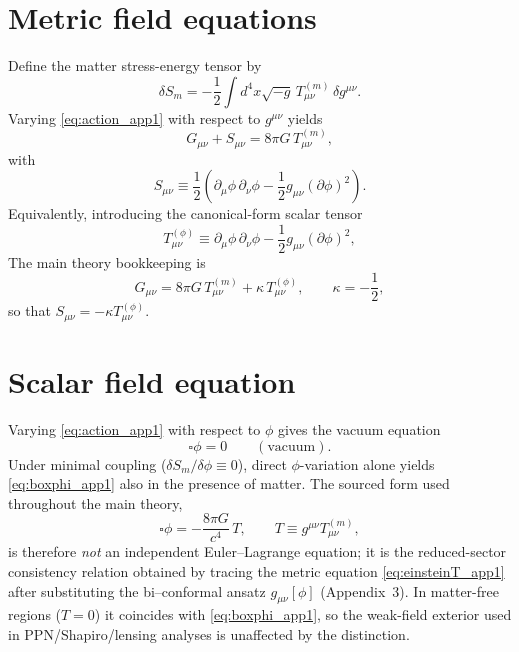 \documentclass[11pt]{article}
\begin{document}
\section{Metric field equations}\label{sec:metric_app1}
Define the matter stress-energy tensor by
\begin{equation}
\delta S_m=-\frac12\int d^4x\sqrt{-g}\,T^{(m)}_{\mu\nu}\,\delta g^{\mu\nu}.
\label{eq:Tmdef_app1}
\end{equation}
Varying \eqref{eq:action_app1} with respect to $g^{\mu\nu}$ yields
\begin{equation}
G_{\mu\nu}+S_{\mu\nu}=8\pi G\,T^{(m)}_{\mu\nu},
\label{eq:einsteinS_app1}
\end{equation}
with
\begin{equation}
S_{\mu\nu}\equiv \frac12\left(\partial_\mu\phi\,\partial_\nu\phi-\frac12 g_{\mu\nu}(\partial\phi)^2\right).
\label{eq:Smunu_app1}
\end{equation}
Equivalently, introducing the canonical-form scalar tensor
\begin{equation}
T^{(\phi)}_{\mu\nu}\equiv \partial_\mu\phi\,\partial_\nu\phi-\frac12 g_{\mu\nu}(\partial\phi)^2,
\label{eq:Tphi_app1}
\end{equation}
The main theory bookkeeping is
\begin{equation}
G_{\mu\nu}=8\pi G\,T^{(m)}_{\mu\nu}+\kappa\,T^{(\phi)}_{\mu\nu},
\qquad \kappa=-\frac12,
\label{eq:einsteinT_app1}
\end{equation}
so that $S_{\mu\nu}=-\kappa T^{(\phi)}_{\mu\nu}$.

\section{Scalar field equation}\label{sec:scalar}
Varying \eqref{eq:action_app1} with respect to $\phi$ gives the vacuum equation
\begin{equation}
\square\phi=0 \qquad (\text{vacuum}).
\label{eq:boxphi_app1}
\end{equation}
Under minimal coupling ($\delta S_m/\delta\phi\equiv 0$), direct $\phi$-variation alone yields \eqref{eq:boxphi_app1} also in the presence of matter. The sourced form used throughout the main theory,
\begin{equation}
\square\phi=-\frac{8\pi G}{c^4}\,T,
\qquad T\equiv g^{\mu\nu}T^{(m)}_{\mu\nu},
\label{eq:boxphiT}
\end{equation}
is therefore \emph{not} an independent Euler--Lagrange equation; it is the reduced-sector consistency relation obtained by tracing the metric equation \eqref{eq:einsteinT_app1} after substituting the bi--conformal ansatz $g_{\mu\nu}[\phi]$ (Appendix~3). In matter-free regions ($T=0$) it coincides with \eqref{eq:boxphi_app1}, so the weak-field exterior used in PPN/Shapiro/lensing analyses is unaffected by the distinction.
\end{document}
